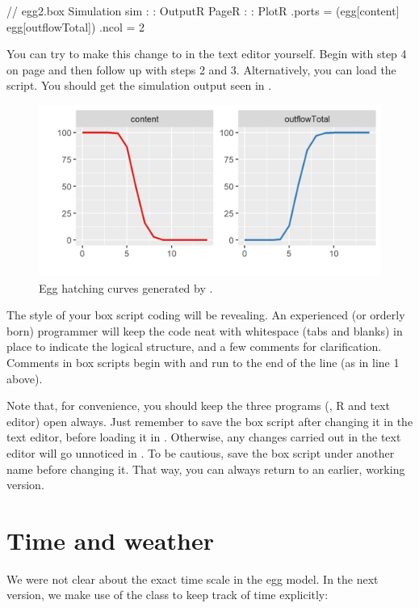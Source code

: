 \lstset{numbers=left}
\begin{boxscript}
// egg2.box
Simulation sim {
:
:
  OutputR {
    PageR {
:
:
      PlotR {
        .ports = (egg[content] egg[outflowTotal])
        .ncol = 2
      }
    }
  }
}
\end{boxscript}
\lstset{numbers=none}

You can try to make this change to  in the text editor yourself. Begin with step 4 on page \pageref{NielsH} and then follow up with steps 2 and 3. Alternatively, you can load the  script. You should get the simulation output seen in .
 
\begin{figure}
\centering
\includegraphics{graphics/egg2}
\caption{Egg hatching curves generated by .}
\label{fig:egg2}
\end{figure}

The style of your box script coding will be revealing. An experienced (or orderly born) programmer will keep the code neat with whitespace (tabs and blanks) in place to indicate the logical structure, and a few comments for clarification. Comments in box scripts begin with \code{//} and run to the end of the line (as in line 1 above).

Note that, for convenience, you should keep the three programs (\US, R and text editor) open always. Just remember to save the box script after changing it in the text editor, before loading it in \US. Otherwise, any changes carried out in the text editor will go unnoticed in \US. To be cautious, save the box script under another name before changing it. That way, you can always return to an earlier, working version.

\section{Time and weather}
We were not clear about the exact time scale in the egg model. In the next version, we make use of the  class to keep track of time explicitly:

